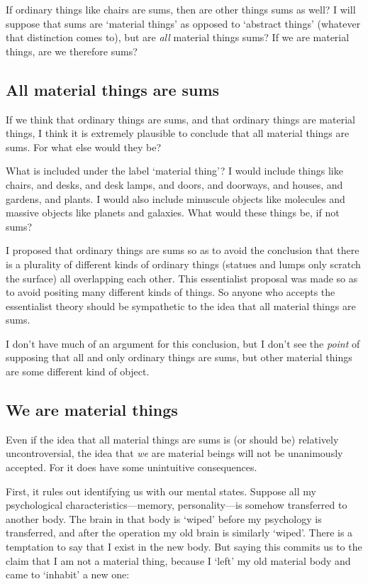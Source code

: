 \documentclass[11pt]{article}
\begin{document}
\begin{spacing}{1.5}
If ordinary things like chairs are sums, then are other things sums as
well?  I will suppose that sums are `material things' as opposed to
`abstract things' (whatever that distinction comes to), but are {\em
  all} material things sums?  If we are material things, are we
therefore sums?

\subsection{All material things are sums}
\label{material-sum}
If we think that ordinary things are sums, and that ordinary things
are material things, I think it is extremely plausible to conclude
that all material things are sums.  For what else would they be?

What is included under the label `material thing'?  I would include
things like chairs, and desks, and desk lamps, and doors, and
doorways, and houses, and gardens, and plants.  I would also include
minuscule objects like molecules and massive objects like planets and
galaxies.  What would these things be, if not sums?

I proposed that ordinary things are sums so as to avoid the conclusion
that there is a plurality of different kinds of ordinary things
(statues and lumps only scratch the surface) all overlapping each
other.  This essentialist proposal was made so as to avoid positing
many different kinds of things.  So anyone who accepts the
essentialist theory should be sympathetic to the idea that all
material things are sums.

I don't have much of an argument for this conclusion, but I don't see
the {\em point} of supposing that all and only ordinary things are
sums, but other material things are some different kind of object.

\subsection{We are material things}
\label{material-beings}
Even if the idea that all material things are sums is (or should be)
relatively uncontroversial, the idea that {\em we} are material beings
will not be unanimously accepted.  For it does have some unintuitive
consequences.  

First, it rules out identifying us with our mental states.  Suppose
all my psychological characteristics---memory, personality---is
somehow transferred to another body.  The brain in that body is
`wiped' before my psychology is transferred, and after the operation
my old brain is similarly `wiped'.  There is a temptation to say that
I exist in the new body.  But saying this commits us to the claim that
I am not a material thing, because I `left' my old material body and
came to `inhabit' a new one:


\end{spacing}
\end{document}
